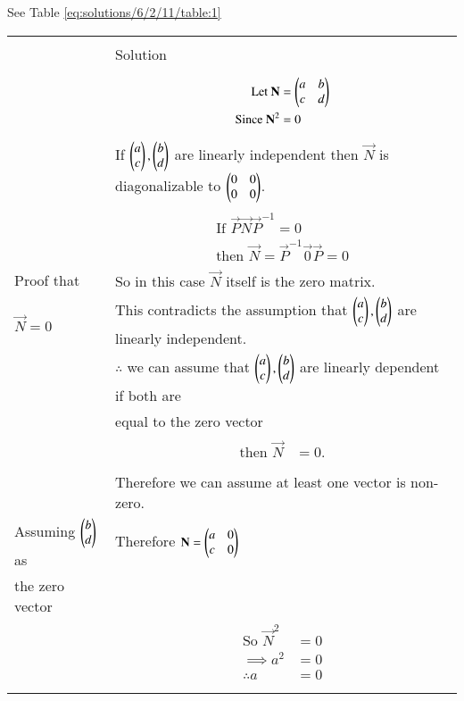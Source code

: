 See Table \ref{eq:solutions/6/2/11/table:1}
\onecolumn
\begin{longtable}{|l|l|}
\hline
\multirow{3}{*}{} & \\
Statement&Solution\\
\hline
&\parbox{6cm}{\begin{align}
\mbox{Let }\mathbf{N}&=\begin{pmatrix}a&b\\c&d\end{pmatrix}\\
\mbox{Since }\mathbf{N}^2&=0
\end{align}}\\
&If $\begin{pmatrix}a\\c\end{pmatrix},\begin{pmatrix}b\\d\end{pmatrix}$ are linearly independent then $\vec{N}$ is diagonalizable to $\begin{pmatrix}0&0\\0&0\end{pmatrix}$.\\
&\parbox{6cm}{\begin{align}
\mbox{If }\vec{P}\vec{N}\vec{P}^{-1}=0\\
\mbox{then }\vec{N}=\vec{P}^{-1}\vec{0}\vec{P}=0
\end{align}}\\
Proof that&So in this case $\vec{N}$ itself is the zero matrix.\\
$\vec{N}=0$&This contradicts the assumption that $\begin{pmatrix}a\\c\end{pmatrix},\begin{pmatrix}b\\d\end{pmatrix}$ are linearly independent.\\
&$\therefore$ we can assume that $\begin{pmatrix}a\\c\end{pmatrix},\begin{pmatrix}b\\d\end{pmatrix}$ are linearly dependent if both are\\
&equal to the zero vector\\
&\parbox{6cm}
{\begin{align}
   \mbox{then } \vec{N} &= 0.
\end{align}}\\
\hline
&\\
&Therefore we can assume at least one vector is non-zero.\\
Assuming $\begin{pmatrix}b\\d\end{pmatrix}$ as&Therefore
$\mathbf{N}=\begin{pmatrix}a&0\\c&0\end{pmatrix}$\\
the zero vector&\\
&\parbox{6cm}{\begin{align}
\mbox{So }\vec{N}^2&=0\\
\implies a^2&=0\\
\therefore a&=0\\

\end{align}}
\end{longtable}
